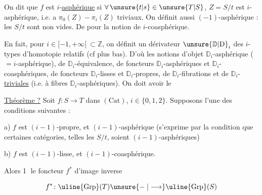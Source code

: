  On dit que $f$ est $i$-\uline{asphérique} si $\forall\,\unsure{t|s}\in\unsure{T|S}$, $Z=S/t$ est $i$-asphérique,  i.e. a $\pi_0(Z)\mathrel{-}\pi_i(Z)$ triviaux. On définit aussi $(-1)$-asphérique : les $S/t$ sont non vides. De  pour la notion de $i$-coasphérique.


En fait, pour $i\in[-1,+\infty[\ \subset\mathbb Z$, on définit un dérivateur $\unsure{\mathbb D|\mathrm D}_i$ des $i$-types d'homotopie relatifs (cf plus bas). D'où les notions d'objet $\mathbb D_i$-asphérique ($=i$-asphérique), de $\mathbb D_i$-équivalence, de foncteurs $\mathbb D_i$-asphériques et $\mathbb D_i$-coasphériques, de foncteurs $\mathbb D_i$-lisses et $\mathbb D_i$-propres, de $\mathbb D_i$-fibrations et de $\mathbb D_i$- \uline{triviales}  (i.e. à fibres $\mathbb D_i$-asphériques). On doit avoir le

\uline{Théorème ?} Soit $f\colon S\longrightarrow T$ dans $(\mathrm{Cat})$, $i\in\{0,1,2\}$.   Supposons l'une des conditions suivantes  :

a) $f$ est $(i-1)$-propre, et $(i-1)$-asphérique (s'exprime par la condition que certaines catégories, telles les $S/t$, soient $(i-1)$-asphériques)

b) $f$ est $(i-1)$-lisse, et $(i-1)$-coasphérique.

Alors \textcircled{1} le foncteur $f^*$ d'image inverse

\[
f^*\colon\uline{\mathrm{Grp}}(T)\unsure{\mathrel{-}|\longrightarrow}\uline{\mathrm{Grp}}(S)
\]

